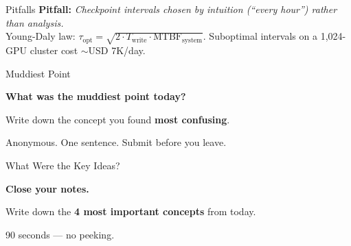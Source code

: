 \documentclass[aspectratio=169, 12pt]{beamer}
\begin{document}
\begin{frame}{Pitfalls}
\vspace{0.05cm}
\textbf{Pitfall:} \textit{Checkpoint intervals chosen by intuition (``every hour'') rather than analysis.}\\
Young-Daly law: $\tau_{\text{opt}} = \sqrt{2 \cdot T_{\text{write}} \cdot \text{MTBF}_{\text{system}}}$. Suboptimal intervals on a 1,024-GPU cluster cost $\sim$USD 7K/day.

\end{frame}


\begin{frame}{Muddiest Point}
\note{
[2 min]
}

\centering
\vspace{1.0cm}
{\Large\bfseries What was the \alert{muddiest point} today?}

\vspace{0.8cm}
{\normalsize Write down the concept you found \textbf{most confusing}.}

\vspace{0.5cm}
{\small\textcolor{midgray}{Anonymous. One sentence. Submit before you leave.}}

\end{frame}

\begin{frame}{What Were the Key Ideas?}

\centering
\vspace{1.5cm}
{\Large\bfseries Close your notes.}

\vspace{0.8cm}
{\large Write down the \textbf{4 most important concepts} from today.}

\vspace{0.8cm}
{\normalsize\textcolor{midgray}{90 seconds --- no peeking.}}

\end{frame}
\end{document}
